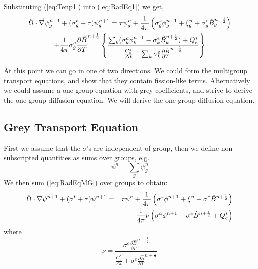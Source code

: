 \documentclass{article}
\newcommand{\dt}{\ensuremath{\Delta t}}
\newcommand{\Cvs}{\ensuremath{C_{v}^{*}}}
\newcommand{\Bnphlf}{\ensuremath{\hat{B}^{n+\frac{1}{2}}}}
\newcommand{\pBnphlfdT}{\ensuremath{\frac{\partial\hat{B}}{\partial T}^{n+\frac{1}{2}}}}
\newcommand{\Bgnphlf}{\ensuremath{\hat{B}_{g}^{n+\frac{1}{2}}}}
\newcommand{\pBgnphlfdT}{\ensuremath{\frac{\partial\hat{B}}{\partial T}^{n+\frac{1}{2}}}}
\newcommand{\Bknphlf}{\ensuremath{\hat{B}_{k}^{n+\frac{1}{2}}}}
\newcommand{\pBknphlfdT}{\ensuremath{\frac{\partial\hat{B}}{\partial T}^{n+\frac{1}{2}}}}
\begin{document}
Substituting (\ref{eq:Tenp1}) into (\ref{eq:RadEq1}) we get,
\begin{multline}
\hat{\Omega} \cdot \del \psi^{n+1}_{g} + (\sigma^{t}_{g} + \tau) \psi^{n+1}_{g}
        =
         \tau \psi_{g}^{n}
        + \frac{1}{4\pi} \left(
                \sigma^{s}_{g} \phi^{n+1}_{g}
                + \xi_{g}^{n}
                + \sigma^{e}_{g} \Bgnphlf \right)
        \\
        + \frac{1}{4\pi} \sigma^{e}_{g} \pBgnphlfdT
                \left\{ \frac{\sum_{k} (\sigma_{k}^{a}\phi_{k}^{n+1} 
                                        - \sigma_{k}^{e}\Bknphlf) + Q_{e}^{*}}
                             {\frac{\Cvs}{\dt} + \sum_{k} \sigma_{k}^{e}\pBknphlfdT}
                \right\}
\label{eq:RadEqMG}
\end{multline}

At this point we can go in one of two directions.  We could form the
multigroup transport equations, and show that they contain fission-like terms.
Alternatively we could assume a one-group equation
with grey coefficients, and strive to derive the
one-group diffusion equation.  We will derive the one-group diffusion equation.

\subsection{Grey Transport Equation}

First we assume that the $\sigma$'s are independent of group, then
we define non-subscripted quantities as sums over groups, e.g.
\begin{equation}
        \psi^{n} = \sum_{g} \psi_{g}^{n}
\end{equation}
We then sum (\ref{eq:RadEqMG}) over groups to obtain:
\begin{eqnarray}
\hat{\Omega} \cdot \del \psi^{n+1} + (\sigma^{t} + \tau) \psi^{n+1}
        &=& \tau \psi^{n}
        + \frac{1}{4\pi} \left( \sigma^{s} \phi^{n+1}
                        + \xi^{n}
                        + \sigma^{e} \Bnphlf \right)
        \nonumber \\
        & & \mbox{}
        + \frac{1}{4\pi} \nu \left( \sigma^{a}\phi^{n+1}
                                        - \sigma^{e}\Bnphlf + Q_{e}^{*}\right)
\label{eq:RadEqGrey}
\end{eqnarray}
where
\begin{equation}
        \nu = \frac{\sigma^{e} \pBnphlfdT } {\frac{\Cvs}{\dt} + \sigma^{e}\pBnphlfdT}
\end{equation}
\end{document}
